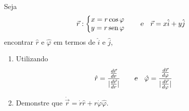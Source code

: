 \begin{prob}
	Seja
	\begin{align}
		\vec{r}:\left\{\begin{matrix}
		x=r\cos\varphi \\
		y=r\operatorname{sen}\varphi
	\end{matrix}\right.\qquad \textsl{e}\quad\vec{r}=x \hat{i}+y \hat{j}
	\end{align}
encontrar $\hat{r}$ e $\hat{\varphi}$ em termos de $\hat{i}$ e $\hat{j}$,

\begin{enumerate}[label=\alph *)]
	\item Utilizando
		\begin{align}
			\hat{r}&=\frac{\frac{d\vec{r}}{dr}}{|\frac{d\vec{r}}{dr}|}				\qquad \textsl{e}\quad\hat{\varphi}=\frac{\frac{d\vec{r}}					{d\varphi}}{|\frac{d\vec{r}}{d\varphi}|}
		\end{align}
	\item Demonstre que $\dot{\vec{r}}=\dot{r}\hat{r}+r\dot{\varphi}\hat{\varphi}$.
	\end{enumerate}
\end{prob}


